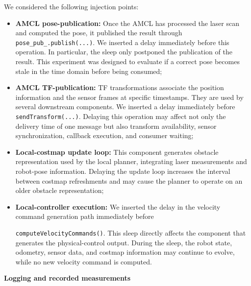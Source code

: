 \noindent We considered the following injection points:
\begin{itemize} [nosep]
    \item \textbf{AMCL pose-publication:} Once the AMCL has processed the laser scan and computed the pose, it published the result through \texttt{pose\_pub\_.publish(...)}. We inserted a delay immediately before this operation. In particular, the sleep only postponed the publication of the result. This experiment was designed to evaluate if a correct pose becomes stale in the time domain before being consumed;
    
    \item \textbf{AMCL TF-publication:} TF transformations associate the position information and the sensor frames at specific timestamps. They are used by several downstream components. We inserted a delay immediately before \texttt{sendTransform(...)}. Delaying this operation may affect not only the delivery time of one message but also transform availability, sensor synchronization, callback execution, and consumer waiting;

    \item \textbf{Local-costmap update loop:} This component generates obstacle representation used by the local planner, integrating laser measurements and robot-pose information. Delaying the update loop increases the interval between costmap refreshments and may cause the planner to operate on an older obstacle representation;
    
    \item \textbf{Local-controller execution:} We inserted the delay in the velocity command generation path immediately
    before 
    
    \texttt{computeVelocityCommands()}. This sleep directly affects the component that generates the physical-control output. During the sleep, the robot state, odometry, sensor data, and costmap information may continue
    to evolve, while no new velocity command is computed.

\end{itemize}

\noindent \textbf{Logging and recorded measurements}

